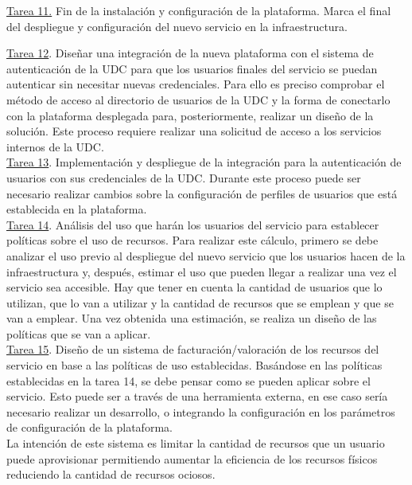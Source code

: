 \underline{Tarea 11.} Fin de la instalación y configuración de la plataforma. Marca el final del despliegue y configuración del nuevo servicio en la infraestructura.

\underline{Tarea 12}. Diseñar una integración de la nueva plataforma con el sistema de autenticación de la UDC para que los usuarios finales del servicio se puedan autenticar sin necesitar nuevas credenciales. Para ello es preciso comprobar el método de acceso al directorio de usuarios de la UDC y la forma de conectarlo con la plataforma desplegada para, posteriormente, realizar un diseño de la solución. Este proceso requiere realizar una solicitud de acceso a los servicios internos de la UDC.\\

\underline{Tarea 13}. Implementación y despliegue de la integración para la autenticación de usuarios con sus credenciales de la UDC. Durante este proceso puede ser necesario realizar cambios sobre la configuración de perfiles de usuarios que está establecida en la plataforma.\\

\underline{Tarea 14}. Análisis del uso que harán los usuarios del servicio para establecer políticas sobre el uso de recursos. Para realizar este cálculo, primero se debe analizar el uso previo al despliegue del nuevo servicio que los usuarios hacen de la infraestructura y, después, estimar el uso que pueden llegar a realizar una vez el servicio sea accesible. Hay que tener en cuenta la cantidad de usuarios que lo utilizan, que lo van a utilizar y la cantidad de recursos que se emplean y que se van a emplear. Una vez obtenida una estimación, se realiza un diseño de las políticas que se van a aplicar.\\

\underline{Tarea 15}. Diseño de un sistema de facturación/valoración de los recursos del servicio en base a las políticas de uso establecidas. Basándose en las políticas establecidas en la tarea 14, se debe pensar como se pueden aplicar sobre el servicio. Esto puede ser a través de una herramienta externa, en ese caso sería necesario realizar un desarrollo, o integrando la configuración en los parámetros de configuración de la plataforma.\\
La intención de este sistema es limitar la cantidad de recursos que un usuario puede aprovisionar permitiendo aumentar la eficiencia de los recursos físicos reduciendo la cantidad de recursos ociosos.\\

